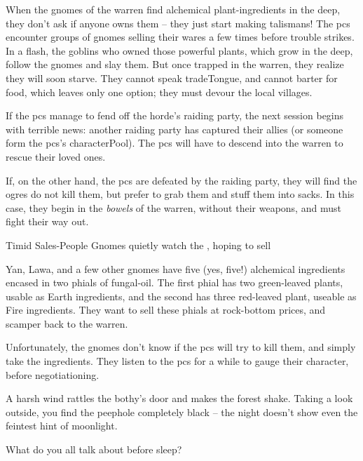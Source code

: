 
\label{gnomeWarrenPrelude}

\noindent
When the gnomes of the \gls{warren} find alchemical plant-\glspl{ingredient} in the \gls{deep}, they don't ask if anyone owns them -- they just start making \glspl{talisman}!
The \glspl{pc} encounter groups of gnomes selling their wares a few times before trouble strikes.
In a flash, the goblins who owned those powerful plants, which grow in the \gls{deep}, follow the gnomes and slay them.
But once trapped in the \gls{warren}, they realize they will soon starve.
They cannot speak \gls{tradeTongue}, and cannot barter for food, which leaves only one option; they must devour the local \glspl{village}.

If the \glspl{pc} manage to fend off the horde's raiding party, the next session begins with terrible news: another raiding party has captured their allies (or someone form the \glspl{pc}'s \gls{characterPool}).
The \glspl{pc} will have to descend into the warren to rescue their loved ones.

If, on the other hand, the \glspl{pc} are defeated by the raiding party, they will find the \glspl{ogre} do not kill them, but prefer to grab them and stuff them into sacks.
In this case, they begin in the \textit{bowels} of the \gls{warren}, without their weapons, and must fight their way out.

{Timid Sales-People}%
{Gnomes quietly watch the , hoping to sell }%

\begin{exampletext}
		Yan, Lawa, and a few other gnomes have five (yes, five!) alchemical \glspl{ingredient} encased in two phials of fungal-oil.
		The first phial has two green-leaved plants, usable as Earth \glspl{ingredient}, and the second has three red-leaved plant, useable as Fire \glspl{ingredient}.
		They want to sell these phials at rock-bottom prices, and scamper back to the \gls{warren}.

		Unfortunately, the gnomes don't know if the \glspl{pc} will try to kill them, and simply take the \glspl{ingredient}.
		They listen to the \glspl{pc} for a while to gauge their character, before negotiationing.

\end{exampletext}


\begin{boxtext}
	A harsh wind rattles the \gls{bothy}'s door and makes the forest shake.
	Taking a look outside, you find the peephole completely black -- the night doesn't show even the feintest hint of moonlight.

	What do you all talk about before sleep?
\end{boxtext}

